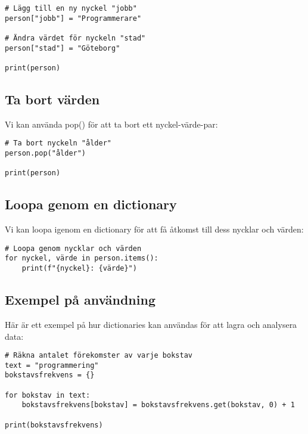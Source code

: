 \begin{lstlisting}[title=Lägga till och ändra värden]
# Lägg till en ny nyckel "jobb"
person["jobb"] = "Programmerare"

# Ändra värdet för nyckeln "stad"
person["stad"] = "Göteborg"

print(person)
\end{lstlisting}

\subsection{Ta bort värden}
Vi kan använda pop() för att ta bort ett nyckel-värde-par:

\begin{lstlisting}[title=Ta bort värden från en dictionary]
# Ta bort nyckeln "ålder"
person.pop("ålder")

print(person)
\end{lstlisting}

\subsection{Loopa genom en dictionary}
Vi kan loopa igenom en dictionary för att få åtkomst till dess nycklar och värden:

\begin{lstlisting}[title=Loop genom en dictionary]
# Loopa genom nycklar och värden
for nyckel, värde in person.items():
    print(f"{nyckel}: {värde}")
\end{lstlisting}

\subsection{Exempel på användning}
Här är ett exempel på hur dictionaries kan användas för att lagra och analysera data:

\begin{lstlisting}[title=Exempel: Räkna antalet bokstäver i en text]
# Räkna antalet förekomster av varje bokstav
text = "programmering"
bokstavsfrekvens = {}

for bokstav in text:
    bokstavsfrekvens[bokstav] = bokstavsfrekvens.get(bokstav, 0) + 1

print(bokstavsfrekvens)
\end{lstlisting}


